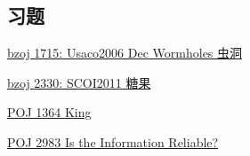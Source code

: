 \subsection{习题}

\href{https://www.lydsy.com/JudgeOnline/problem.php?id=1715}{ bzoj 1715: Usaco2006 Dec Wormholes 虫洞 } 

\href{https://www.lydsy.com/JudgeOnline/problem.php?id=2330}{ bzoj 2330: SCOI2011 糖果 }

\href{http://poj.org/problem?id=1364}{ POJ 1364 King }

\href{http://poj.org/problem?id=2983}{ POJ 2983 Is the Information Reliable? }
